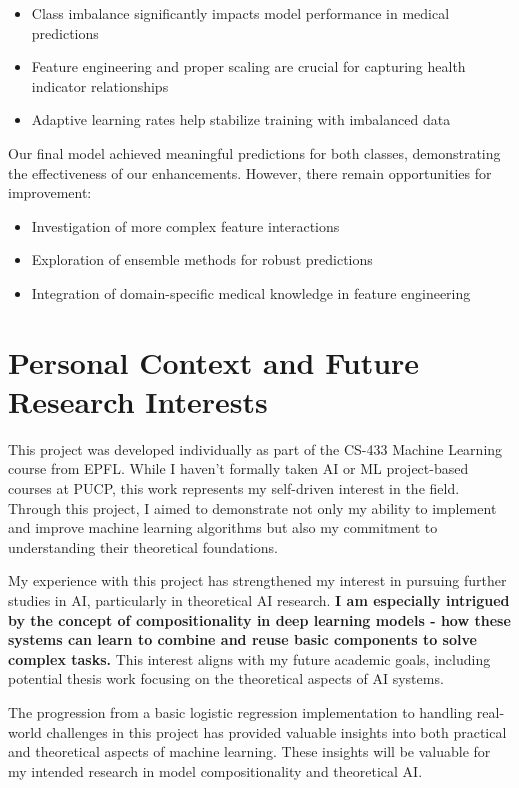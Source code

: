 \documentclass[10pt,conference,compsocconf]{IEEEtran}
\begin{document}
\begin{itemize}
    \item Class imbalance significantly impacts model performance in medical predictions
    \item Feature engineering and proper scaling are crucial for capturing health indicator
    relationships
    \item Adaptive learning rates help stabilize training with imbalanced data
\end{itemize}

Our final model achieved meaningful predictions for both classes, demonstrating the
effectiveness of our enhancements. However, there remain opportunities for improvement:

\begin{itemize}
    \item Investigation of more complex feature interactions
    \item Exploration of ensemble methods for robust predictions
    \item Integration of domain-specific medical knowledge in feature engineering
\end{itemize}

\section{Personal Context and Future Research Interests}

This project was developed individually as part of the CS-433 Machine Learning course from EPFL.
While I haven't formally taken AI or ML project-based courses at PUCP,
this work represents my self-driven interest in the field. Through this project,
I aimed to demonstrate not only my ability to implement and improve machine learning
algorithms but also my commitment to understanding their theoretical foundations.

My experience with this project has strengthened my interest in pursuing further studies in AI,
particularly in theoretical AI research. \textbf{I am especially intrigued by the concept of
compositionality in deep learning models - how these systems can learn to combine and reuse
basic components to solve complex tasks.} This interest aligns with my future academic goals,
including potential thesis work focusing on the theoretical aspects of AI systems.

The progression from a basic logistic regression implementation to handling real-world
challenges in this project has provided valuable insights into both practical
and theoretical aspects of machine learning. These insights will be valuable for
my intended research in model compositionality and theoretical AI.
\end{document}
